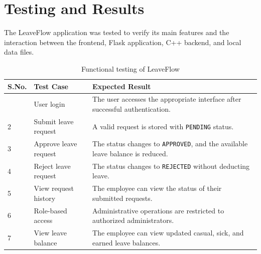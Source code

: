 \documentclass[12pt,a4paper,oneside]{book}
\begin{document}
\FloatBarrier

\section{Testing and Results}



The LeaveFlow application was tested to verify its main features and the interaction between the frontend, Flask application, C++ backend, and local data files.



\begin{table}[H]

\centering

\renewcommand{\arraystretch}{1.2}

\begin{tabularx}{\textwidth}{|>{\centering\arraybackslash}p{1.1cm}|p{3.3cm}|X|}

\hline

\textbf{S.No.} & \textbf{Test Case} & \textbf{Expected Result} \\

\hline

1 & User login & The user accesses the appropriate interface after successful authentication. \\

\hline

2 & Submit leave request & A valid request is stored with \texttt{PENDING} status. \\

\hline

3 & Approve leave request & The status changes to \texttt{APPROVED}, and the available leave balance is reduced. \\

\hline

4 & Reject leave request & The status changes to \texttt{REJECTED} without deducting leave. \\

\hline

5 & View request history & The employee can view the status of their submitted requests. \\

\hline

6 & Role-based access & Administrative operations are restricted to authorized administrators. \\

\hline

7 & View leave balance & The employee can view updated casual, sick, and earned leave balances. \\

\hline

\end{tabularx}

\caption{Functional testing of LeaveFlow}
\label{tab:functional-testing}

\end{table}
\end{document}
